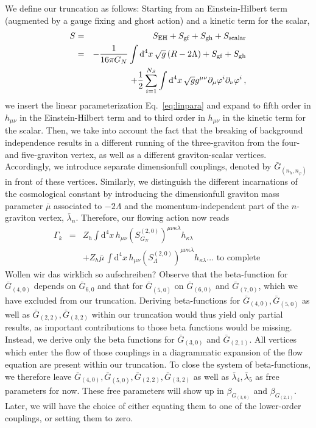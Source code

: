 \documentclass[11pt]{book} %
\newcommand{\bea}{\begin{eqnarray}}
\newcommand{\eea}{\end{eqnarray}}
\begin{document}
We define our truncation as follows: 
Starting from an Einstein-Hilbert term (augmented by a gauge fixing and ghost action) and a kinetic term for the scalar,
\bea
S &=& S_{\rm EH} + S_{\rm gf} + S_{\rm gh} + S_{\rm scalar}\nonumber\\
&=& -\frac{1}{16 \pi G_N} \int \mathrm d^4 x\, \sqrt{g}\left(R - 2 \Lambda \right)+ S_{\rm gf} + S_{\rm gh} \nonumber\\
&{}&+\frac{1}{2}\sum_{i=1}^{N_S} \int \mathrm  d^4 x\, \sqrt{g} g^{\mu \nu} \partial_{\mu}\varphi^i\partial_{\nu}\varphi^i\,,
\eea
we insert the linear parameterization Eq.~\eqref{eq:linpara} and 
expand to fifth order in $h_{\mu \nu}$ in the Einstein-Hilbert term and 
to third order in $h_{\mu \nu}$ in the kinetic term for the scalar. 
Then, we take into account the fact that the breaking of background independence 
results in a different running of the three-graviton from the four- and five-graviton vertex,
as well as a different graviton-scalar vertices. 
Accordingly, we introduce separate dimensionfull couplings, denoted by $\bar{G}_{(n_h, n_{\varphi})}$ in front of these vertices. 
Similarly, we distinguish the different incarnations of the cosmological constant 
by introducing the dimensionfull graviton mass parameter $\bar{\mu}$ associated to $- 2 \Lambda$ and 
the momentum-independent part of the $n$-graviton vertex, $\bar{\lambda}_n$.
Therefore, our flowing action now reads
\bea
\Gamma_k& =& Z_h \int \mathrm d^4 x\, h_{\mu \nu} \left(S_{G_N}^{(2,0)}\right)^{\mu \nu \kappa \lambda}h_{\kappa \lambda} \nonumber\\
&{}&+ Z_h \bar{\mu}\, \int \mathrm  d^4 x\, h_{\mu \nu} \left(S_{\Lambda}^{(2,0)}\right)^{\mu \nu \kappa \lambda}h_{\kappa \lambda} \dots \mbox{ to complete }
\eea
{\colmr Wollen wir das wirklich so aufschreiben?}
Observe that the beta-function for $\bar{G}_{(4,0)}$ depends on $\bar{G}_{6,0}$ and 
that for $\bar{G}_{(5,0)}$ on $\bar{G}_{(6,0)}$ and $\bar{G}_{(7,0)}$, 
which we have excluded from our truncation. 
Deriving beta-functions for $\bar{G}_{(4,0)}, \bar{G}_{(5,0)}$ as well as $\bar{G}_{(2,2)}, \bar{G}_{(3,2)}$ within our truncation 
would thus yield only partial results, as important contributions to those beta functions would be missing. 
Instead, we derive only the beta functions for $\bar{G}_{(3,0)}$ and $\bar{G}_{(2,1)}$. 
All vertices which enter the flow of those couplings in a diagrammatic expansion of the flow equation are present within our truncation.
To close the system of beta-functions, we therefore leave $\bar{G}_{(4,0)}, \bar{G}_{(5,0)}, \bar{G}_{(2,2)}, \bar{G}_{(3,2)}$ as well as $\bar{\lambda}_4, \bar{\lambda}_5$ as free parameters for now. 
These free parameters will show up in $\beta_{G_{(3,0)}}$ and $\beta_{G_{(2,1)}}$.
Later, we will have the choice of either equating them to one of the lower-order couplings, or setting them to zero.
\end{document}
